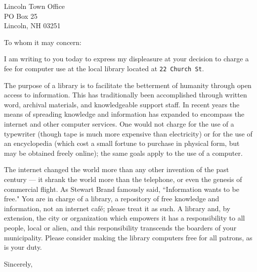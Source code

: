 \documentclass{letter}
\begin{document}
\begin{letter}{Lincoln Town Office \\ PO Box 25 \\ Lincoln, NH 03251}
\opening{To whom it may concern:}

I am writing to you today to express my
displeasure at your decision to charge a
fee for computer use at the local library
located at \texttt{22 Church St}.

The purpose of a library is to facilitate
the betterment of humanity through open
access to information. This has traditionally
been accomplished through written word,
archival materials, and knowledgeable
support staff. In recent years the means of
spreading knowledge and information has
expanded to encompass the internet and other
computer services. One would not charge for
the use of a typewriter (though tape is much
more expensive than electricity) or for the
use of an encyclopedia (which cost a small
fortune to purchase in physical form, but may
be obtained freely online); the same goals
apply to the use of a computer.

The internet changed the world more than any
other invention of the past century ---
it shrank the world more than the telephone,
or even the genesis of commercial flight.
As Stewart Brand famously said, ``Information
wants to be free." You are in charge of a
library, a repository of free knowledge and
information, not an internet caf\'e; please
treat it as such. A library and, by extension,
the city or organization which empowers it
has a responsibility to all people, local
or alien, and this responsibility transcends
the boarders of your municipality. Please
consider making the library computers free
for all patrons, as is your duty.

\closing{Sincerely,}

\end{letter}
\end{document}
